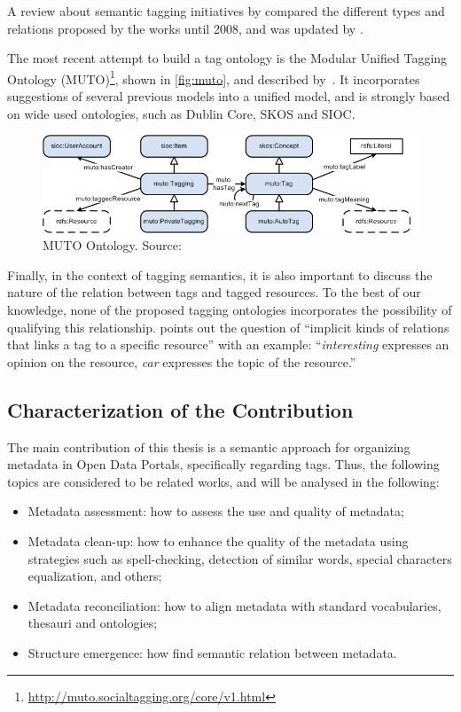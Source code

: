 A review about semantic tagging initiatives by  compared the different types and relations proposed by the works until 2008, and was updated by .

The most recent attempt to build a tag ontology is the Modular Unified Tagging Ontology (MUTO)\footnote{\url{http://muto.socialtagging.org/core/v1.html}}, shown in \autoref{fig:muto}, and described by~.
It incorporates suggestions of several previous models into a unified model, and is strongly based on wide used ontologies, such as Dublin Core, SKOS and SIOC. 

\begin{figure}[tb]
\begin{center}
\includegraphics[width=\columnwidth]{images/muto.png}
\caption[MUTO Ontology.]{MUTO Ontology. Source: }
\label{fig:muto}
\end{center}
\end{figure}

Finally, in the context of tagging semantics, it is also important to discuss the nature of the relation between tags and tagged resources.
To the best of our knowledge, none of the proposed tagging ontologies incorporates the possibility of qualifying this relationship.
 points out the question of ``implicit kinds of relations that links a tag to a specific resource'' with an example: ``\emph{interesting} expresses an opinion on the resource, \emph{car} expresses the topic of the resource.''

\subsection{Characterization of the Contribution}

The main contribution of this thesis is a semantic approach for organizing metadata in Open Data Portals, specifically regarding tags.
Thus, the following topics are considered to be related works, and will be analysed in the following:
\begin{itemize}
	\item Metadata assessment: how to assess the use and quality of metadata;
	\item Metadata clean-up: how to enhance the quality of the metadata using strategies such as spell-checking, detection of similar words, special characters equalization, and others;
	\item Metadata reconciliation: how to align metadata with standard vocabularies, thesauri and ontologies;
	\item Structure emergence: how find semantic relation between metadata.
\end{itemize}

